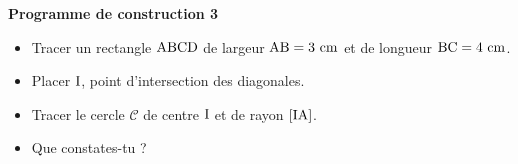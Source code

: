 \documentclass[exercice,a4]{thedocument}%
\begin{document}
%
\noindent\textbf{Programme de construction 3}\par\smallskip\noindent
\begin{itemize}
    \item Tracer un rectangle $\text{ABCD}$ de largeur
    $\text{AB}=3\text{ cm}$ et de longueur $\text{BC}=4\text{ cm}$.
    \item Placer $\text{I}$, point d'intersection des diagonales.
    \item Tracer le cercle $\mathcal{C}$ de centre $\text{I}$ et de
    rayon $[\text{IA}]$.
    \item Que constates-tu ?
\end{itemize}
\end{document}
